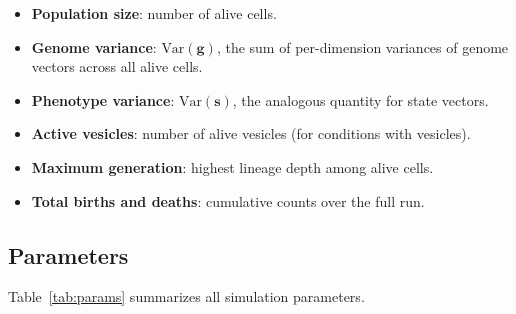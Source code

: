 \documentclass[10pt,twocolumn]{article}
\begin{document}
\begin{itemize}
  \item \textbf{Population size}: number of alive cells.
  \item \textbf{Genome variance}: $\text{Var}(\mathbf{g})$, the sum of per-dimension variances of genome vectors across all alive cells.
  \item \textbf{Phenotype variance}: $\text{Var}(\mathbf{s})$, the analogous quantity for state vectors.
  \item \textbf{Active vesicles}: number of alive vesicles (for conditions with vesicles).
  \item \textbf{Maximum generation}: highest lineage depth among alive cells.
  \item \textbf{Total births and deaths}: cumulative counts over the full run.
\end{itemize}

\subsection{Parameters}

Table~\ref{tab:params} summarizes all simulation parameters.
\end{document}
